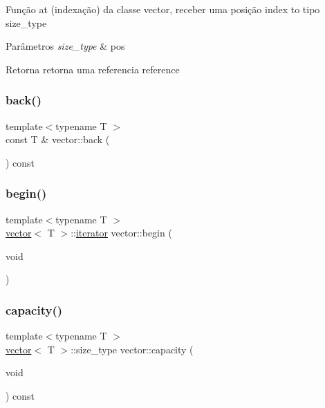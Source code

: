 Função at (indexação) da classe vector, receber uma posição index to tipo size\+\_\+type 
\begin{DoxyParams}{Parâmetros}
{\em size\+\_\+type} & pos \\
\hline
\end{DoxyParams}
\begin{DoxyReturn}{Retorna}
retorna uma referencia reference 
\end{DoxyReturn}
\mbox{\label{classsc_1_1vector_ad0b2d8bbc192a8cf340636fb66d26786}} 
\subsubsection{\texorpdfstring{back()}{back()}}
{\footnotesize\ttfamily template$<$typename T $>$ \\
const T \& vector\+::back (\begin{DoxyParamCaption}{ }\end{DoxyParamCaption}) const}

\mbox{\label{classsc_1_1vector_ae198130cd01e8d5a4df07d6567b51eb4}} 
\subsubsection{\texorpdfstring{begin()}{begin()}}
{\footnotesize\ttfamily template$<$typename T $>$ \\
\mbox{\hyperlink{classsc_1_1vector}{vector}}$<$ T $>$\+::\mbox{\hyperlink{classsc_1_1vector_1_1iterator}{iterator}} vector\+::begin (\begin{DoxyParamCaption}\item[{void}]{ }\end{DoxyParamCaption})}

\mbox{\label{classsc_1_1vector_acf5f0cebfb797dac6eb42523d1e7511a}} 
\subsubsection{\texorpdfstring{capacity()}{capacity()}}
{\footnotesize\ttfamily template$<$typename T $>$ \\
\mbox{\hyperlink{classsc_1_1vector}{vector}}$<$ T $>$\+::size\+\_\+type vector\+::capacity (\begin{DoxyParamCaption}\item[{void}]{ }\end{DoxyParamCaption}) const}

